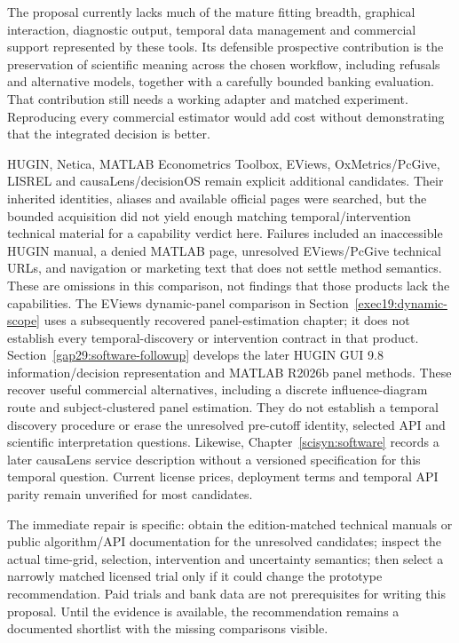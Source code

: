 The proposal currently lacks much of the mature fitting breadth,
graphical interaction, diagnostic output, temporal data management and
commercial support represented by these tools. Its defensible
prospective contribution is the preservation of scientific meaning
across the chosen workflow, including refusals and alternative models,
together with a carefully bounded banking evaluation. That contribution
still needs a working adapter and matched experiment. Reproducing every
commercial estimator would add cost without demonstrating that the
integrated decision is better.

HUGIN, Netica, MATLAB Econometrics Toolbox, EViews, OxMetrics/PcGive,
LISREL and causaLens/decisionOS remain explicit additional candidates.
Their inherited identities, aliases and available official pages were
searched, but the bounded acquisition did not yield enough matching
temporal/intervention technical material for a capability verdict here.
Failures included an inaccessible HUGIN manual, a denied MATLAB page,
unresolved EViews/PcGive technical URLs, and navigation or marketing
text that does not settle method semantics. These are omissions in this
comparison, not findings that those products lack the capabilities.
The EViews dynamic-panel comparison in Section~\ref{exec19:dynamic-scope}
uses a subsequently recovered panel-estimation chapter; it does not establish
every temporal-discovery or intervention contract in that product.
Section~\ref{gap29:software-followup} develops the later HUGIN GUI 9.8
information/decision representation and MATLAB R2026b panel methods. These
recover useful commercial alternatives, including a discrete influence-diagram
route and subject-clustered panel estimation. They do not establish a temporal
discovery procedure or erase the unresolved pre-cutoff identity, selected API
and scientific interpretation questions. \citep{gap29hugin,gap29matlab}
Likewise,
Chapter~\ref{scisyn:software} records a later causaLens service description
without a versioned specification for this temporal question. Current license
prices, deployment terms and temporal API parity remain unverified for most
candidates.

The immediate repair is specific: obtain the edition-matched technical
manuals or public algorithm/API documentation for the unresolved
candidates; inspect the actual time-grid, selection, intervention and
uncertainty semantics; then select a narrowly matched licensed trial
only if it could change the prototype recommendation. Paid trials and
bank data are not prerequisites for writing this proposal. Until the
evidence is available, the recommendation remains a documented shortlist
with the missing comparisons visible.

